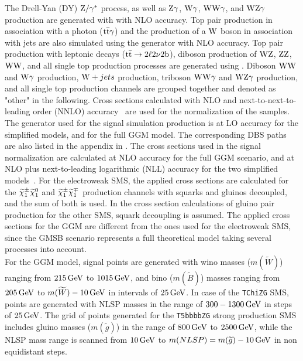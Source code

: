 The Drell-Yan (DY) $\mathrm{Z}/\gamma^{*}$ process, as well as $\mathrm{Z}\gamma$, $\mathrm{W}\gamma$, $\mathrm{W}\mathrm{W}\gamma$, and $\mathrm{W}\mathrm{Z}\gamma$ production are generated with \MGvATNLO with NLO accuracy. Top pair production in association with a photon (${\mathrm{t}\overline{\mathrm{t}}}\gamma$) and the production of a $\mathrm{W}$ boson in association with jets are also simulated using the \MGvATNLO generator with NLO accuracy. Top pair production with leptonic decays (${\mathrm{t}\overline{\mathrm{t}}}\to 2\ell 2\nu 2\mathrm{b}$), diboson production of $\mathrm{W}\mathrm{Z}$, $\mathrm{Z}\mathrm{Z}$, $\mathrm{W}\mathrm{W}$, and all single top production processes are generated using \POWHEG.
Diboson $\mathrm{W}\mathrm{W}$ and $\mathrm{W}\gamma$ production, $\mathrm{W}+jets$ production, triboson $\mathrm{W}\mathrm{W}\gamma$ and $\mathrm{W}\mathrm{Z}\gamma$ production, and all single top production channels are grouped together and denoted as "other" in the following.
Cross sections calculated with NLO and next-to-next-to-leading order (NNLO) accuracy~\cite{xsec1,xsec2,xsec3,xsec4,xsec5,xsec6,xsec7,xsec8,xsec9} are used for the normalization of the samples.\\
The generator used for the signal simulation production is \MGvATNLO at LO accuracy for the simplified models, and  for the full GGM model. The corresponding DBS paths are also listed in the appendix in .
The cross sections used in the signal normalization are calculated at NLO accuracy for the full GGM scenario, and at NLO plus next-to-leading logarithmic (NLL) accuracy for the two simplified models~\cite{sxsec1,sxsec2,sxsec3,sxsec4,sxsec5,sxsec6,sxsec7,sxsec8,sxsec9}.
For the electroweak SMS, the applied cross sections are calculated for the $\widetilde{\chi}^\pm_{1}\widetilde{\chi}^{0}_{1}$ and $\widetilde{\chi}^\pm_{1}\widetilde{\chi}^\mp_{1}$ production channels with squarks and gluinos decoupled, and the sum of both is used. In the cross section calculations of gluino pair production for the other SMS, squark decoupling is assumed. The applied cross sections for the GGM are different from the ones used for the electroweak SMS, since the GMSB scenario represents a full theoretical model taking several processes into account.\\
For the GGM model, signal points are generated with wino masses ($m(\widetilde{W})$) ranging from $215\,\text{Ge\hspace{-.08em}V}$ to $1015\,\text{Ge\hspace{-.08em}V}$, and bino ($m(\widetilde{B})$) masses ranging from $205\,\text{Ge\hspace{-.08em}V}$ to $m(\widetilde{W})-10\,\text{Ge\hspace{-.08em}V}$ in intervals of $25\,\text{Ge\hspace{-.08em}V}$.
In case of the \texttt{TChiZG} SMS, points are generated with NLSP masses in the range of $300-1300\,\text{Ge\hspace{-.08em}V}$ in steps of $25\,\text{Ge\hspace{-.08em}V}$. The grid of points generated for the \texttt{T5bbbbZG} strong production SMS includes gluino masses ($m(\widetilde{g})$) in the range of $800\,\text{Ge\hspace{-.08em}V}$ to $2500\,\text{Ge\hspace{-.08em}V}$, while the NLSP mass range is scanned from $10\,\text{Ge\hspace{-.08em}V}$ to $m(NLSP)=m(\widetilde{g})-10\,\text{Ge\hspace{-.08em}V}$ in non equidistant steps.\\
